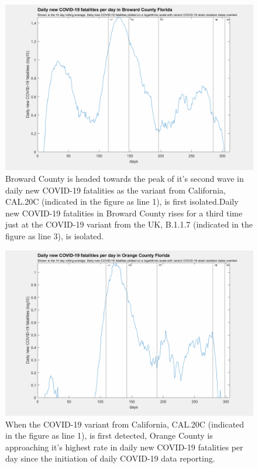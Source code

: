 \documentclass[]{article}
\begin{document}
\begin{figure}[!h]
	\includegraphics[width=\linewidth]{images/broward_fatalities_strains_log.png}
	\caption{Broward County is headed towards the peak of it's second wave in daily new COVID-19 fatalities as the variant from California, CAL.20C (indicated in the figure as line 1), is first isolated.Daily new COVID-19 fatalities in Broward County rises for a third time just at the COVID-19 variant from the UK, B.1.1.7 (indicated in the figure as line 3), is isolated.}
	\label{fig:images/broward_fatalities_strains_logLabel}
\end{figure}


\begin{figure}[!h]
	\includegraphics[width=\linewidth]{images/orange_fatalities_strains_log.png}
	\caption{When the COVID-19 variant from California, CAL.20C (indicated in the figure as line 1), is first detected, Orange County is approaching it's highest rate in daily new COVID-19 fatalities per day since the initiation of daily COVID-19 data reporting.  }
	\label{fig:images/orange_fatalities_strains_logLabel}
\end{figure}
\end{document}
